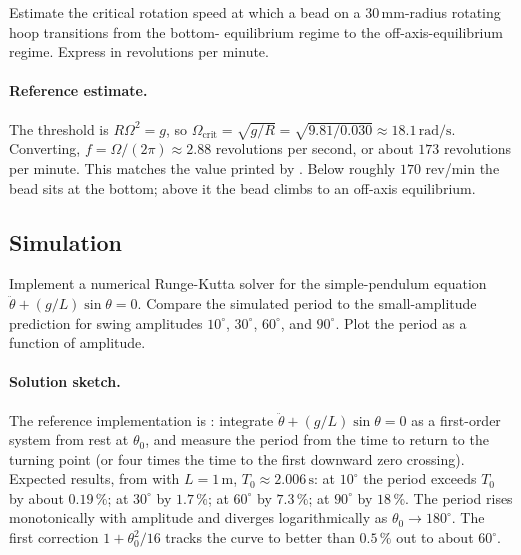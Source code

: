 \begin{exercise}
Estimate the critical rotation speed at which a bead on a $30\,\si
{\milli\meter}$-radius rotating hoop transitions from the bottom-
equilibrium regime to the off-axis-equilibrium regime. Express in
revolutions per minute.

\paragraph{Reference estimate.} The threshold is $R\Omega^2 = g$, so
$\Omega_\text{crit} = \sqrt{g/R} = \sqrt{9.81/0.030} \approx
18.1\,\si{\radian\per\second}$. Converting, $f = \Omega/(2\pi) \approx
2.88$ revolutions per second, or about $173$ revolutions per minute.
This matches the value printed by .
Below roughly $170$ rev/min the bead sits at the bottom; above it the
bead climbs to an off-axis equilibrium.
\end{exercise}

\subsection*{Simulation}

\begin{exercise}
Implement a numerical Runge-Kutta solver for the simple-pendulum
equation $\ddot{\theta} + (g/L)\sin\theta = 0$. Compare the simulated
period to the small-amplitude prediction for swing amplitudes
$10^{\circ}$, $30^{\circ}$, $60^{\circ}$, and $90^{\circ}$. Plot the
period as a function of amplitude.

\paragraph{Solution sketch.} The reference implementation is
: integrate $\ddot\theta + (g/L)\sin\theta
= 0$ as a first-order system from rest at $\theta_0$, and measure the
period from the time to return to the turning point (or four times the
time to the first downward zero crossing). Expected results, from
 with $L = 1\,\si{\meter}$, $T_0 \approx
2.006\,\si{\second}$: at $10^\circ$ the period exceeds $T_0$ by about
$0.19\,\%$; at $30^\circ$ by $1.7\,\%$; at $60^\circ$ by $7.3\,\%$; at
$90^\circ$ by $18\,\%$. The period rises monotonically with amplitude
and diverges logarithmically as $\theta_0\to 180^\circ$. The first
correction $1 + \theta_0^2/16$ tracks the curve to better than $0.5\,\%$
out to about $60^\circ$.
\end{exercise}

